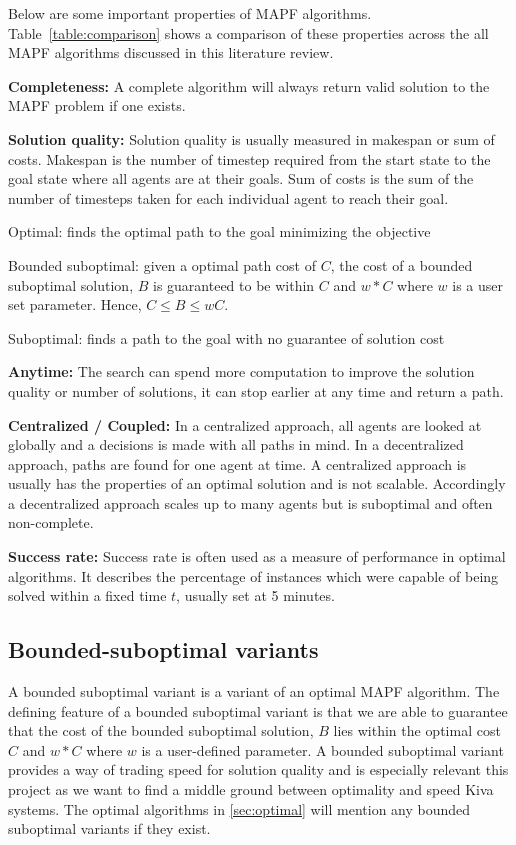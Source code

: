 \documentclass[a4paper,11pt]{article}
\begin{document}
Below are some important properties of MAPF algorithms. Table~\ref{table:comparison} shows a comparison of these properties across the all MAPF algorithms discussed in this literature review.

\noindent \textbf{Completeness:} A complete algorithm will always return valid solution to the MAPF problem if one exists.

\noindent \textbf{Solution quality:} Solution quality is usually measured in makespan or sum of costs. Makespan is the number of timestep required from the start state to the goal state where all agents are at their goals. Sum of costs is the sum of the number of timesteps taken for each individual agent to reach their goal.
\begin{compactitem}
	\item Optimal: finds the optimal path to the goal minimizing the objective
	\item Bounded suboptimal: given a optimal path cost of $C$, the cost of a bounded suboptimal solution, $B$ is guaranteed to be within $C$ and $w*C$ where $w$ is a user set parameter. Hence, $C \le B \le wC$.
	\item Suboptimal: finds a path to the goal with no guarantee of solution cost
\end{compactitem}

\noindent \textbf{Anytime:} The search can spend more computation to improve the solution quality or number of solutions, it can stop earlier at any time and return a path.

\noindent \textbf{Centralized / Coupled:} In a centralized approach, all agents are looked at globally and a decisions is made with all paths in mind. In a decentralized approach, paths are found for one agent at time. A centralized approach is usually has the properties of an optimal solution and is not scalable. Accordingly a decentralized approach scales up to many agents but is suboptimal and often non-complete.

\noindent \textbf{Success rate:} Success rate is often used as a measure of performance in optimal algorithms. It describes the percentage of instances which were capable of being solved within a fixed time $t$, usually set at 5 minutes.

\subsection{Bounded-suboptimal variants} 
A bounded suboptimal variant is a variant of an optimal MAPF algorithm. The defining feature of a bounded suboptimal variant is that we are able to guarantee that the cost of the bounded suboptimal solution, $B$ lies within the optimal cost $C$ and $w*C$ where $w$ is a user-defined parameter. A bounded suboptimal variant provides a way of trading speed for solution quality and is especially relevant this project as we want to find a middle ground between optimality and speed Kiva systems. The optimal algorithms in \ref{sec:optimal} will mention any bounded suboptimal variants if they exist.
\end{document}
